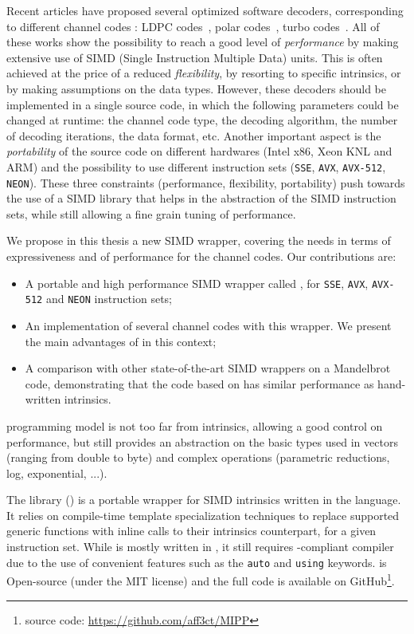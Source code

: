 Recent articles have proposed several optimized software decoders, corresponding
to different channel codes : LDPC codes~\cite{LeGal2015,LeGal2016}, polar
codes~\cite{Giard2016b,Sarkis2016,Cassagne2015c,Cassagne2016b}, turbo
codes~\cite{Zhang2012,Wu2013,Cassagne2016a}. All of these works show the
possibility to reach a good level of \textit{performance} by  making extensive
use of SIMD (Single Instruction Multiple Data) units. This is often achieved at
the price of a reduced \textit{flexibility}, by resorting to specific
intrinsics, or by making assumptions on the data types. However, these decoders
should be implemented in a single source code, in which the following parameters
could be changed at runtime: the channel code type, the decoding algorithm, the
number of decoding iterations, the data format, etc. Another important aspect is
the \textit{portability} of the source code on different hardwares (Intel x86,
Xeon KNL and ARM) and the possibility to use different instruction sets
(\verb|SSE|, \verb|AVX|, \verb|AVX-512|, \verb|NEON|). These three constraints
(performance, flexibility, portability) push towards the use of a SIMD library
that helps in the abstraction of the SIMD instruction sets, while still allowing
a fine grain tuning of performance.

We propose in this thesis a new \Cxx SIMD wrapper, covering the needs in terms
of expressiveness and of performance for the channel codes. Our contributions
are:
\begin{itemize}
  \item A portable and high performance  \Cxx SIMD wrapper called \MIPP, for
    \verb|SSE|, \verb|AVX|, \verb|AVX-512| and \verb|NEON| instruction sets;
  \item An implementation of several channel codes with this wrapper. We
    present the main advantages of \MIPP in this context;
  \item A comparison with other state-of-the-art SIMD wrappers on a Mandelbrot
    code, demonstrating that the code based on \MIPP has similar performance as
    hand-written intrinsics.
\end{itemize}
\MIPP programming model is not too far from intrinsics, allowing a good control
on performance, but still provides an abstraction on the basic types used in
vectors (ranging from double to byte) and complex operations (parametric
reductions, log, exponential, ...).

The \longMIPP library (\MIPP) is a portable wrapper for SIMD intrinsics written
in the \Cxx language. It relies on \Cxx compile-time template specialization
techniques to replace supported generic functions with inline calls to their
intrinsics counterpart, for a given instruction set. While \MIPP is mostly
written in , it still requires -compliant compiler due to the
use of convenient features such as the \verb|auto| and \verb|using| keywords.
\MIPP is Open-source (under the MIT license) and the full code is available on
GitHub\footnote{\MIPP source code: \url{https://github.com/aff3ct/MIPP}}.

